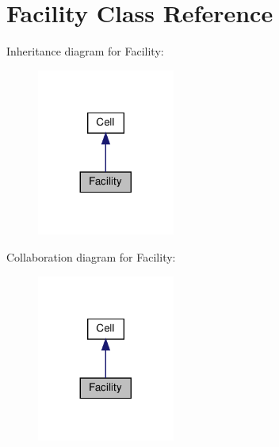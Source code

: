 \hypertarget{classFacility}{}\section{Facility Class Reference}
\label{classFacility}


Inheritance diagram for Facility\+:
\nopagebreak
\begin{figure}[H]
\begin{center}
\leavevmode
\includegraphics[width=128pt]{classFacility__inherit__graph}
\end{center}
\end{figure}


Collaboration diagram for Facility\+:
\nopagebreak
\begin{figure}[H]
\begin{center}
\leavevmode
\includegraphics[width=128pt]{classFacility__coll__graph}
\end{center}
\end{figure}
